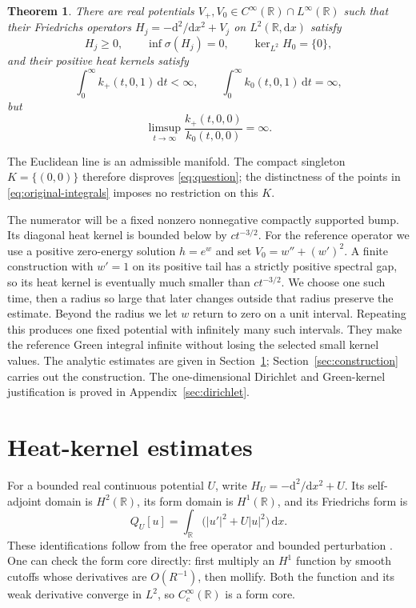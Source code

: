 \documentclass[11pt,a4paper]{article}
\newtheorem{theorem}{Theorem}[section]
\newcommand{\R}{\mathbb R}
\newcommand{\dd}{\,\mathrm d}
\newcommand{\spec}{\sigma}
\begin{document}
\begin{theorem}\label{thm:main}
There are real potentials $V_+,V_0\in C^\infty(\R)\cap L^\infty(\R)$ such
that their Friedrichs operators $H_j=-\mathrm d^2/\mathrm dx^2+V_j$ on
$L^2(\R,\mathrm dx)$ satisfy
\[
 H_j\geq0,\qquad \inf\spec(H_j)=0,\qquad \ker_{L^2}H_0=\{0\},
\]
and their positive heat kernels satisfy
\begin{equation}\label{eq:main-integrals}
 \int_0^\infty k_+(t,0,1)\dd t<\infty,
 \qquad \int_0^\infty k_0(t,0,1)\dd t=\infty,
\end{equation}
but
\begin{equation}\label{eq:main-ratio}
 \limsup_{t\to\infty}\frac{k_+(t,0,0)}{k_0(t,0,0)}=\infty.
\end{equation}
\end{theorem}

The Euclidean line is an admissible manifold. The compact singleton
$K=\{(0,0)\}$ therefore disproves \eqref{eq:question}; the distinctness of
the points in \eqref{eq:original-integrals} imposes no restriction on this $K$.

The numerator will be a fixed nonzero nonnegative compactly supported bump.
Its diagonal heat kernel is bounded below by $ct^{-3/2}$. For the reference
operator we use a positive zero-energy solution $h=e^w$ and set
$V_0=w''+(w')^2$. A finite construction with $w'=1$ on its positive tail has
a strictly positive spectral gap, so its heat kernel is eventually much
smaller than $ct^{-3/2}$. We choose one such time, then a radius so large
that later changes outside that radius preserve the estimate. Beyond the
radius we let $w$ return to zero on a unit interval. Repeating this produces
one fixed potential with infinitely many such intervals. They make the
reference Green integral infinite without losing the selected small kernel
values. The analytic estimates are given in Section~\ref{sec:estimates};
Section~\ref{sec:construction} carries out the construction. The
one-dimensional Dirichlet and Green-kernel justification is proved in
Appendix~\ref{sec:dirichlet}.

\section{Heat-kernel estimates}\label{sec:estimates}

For a bounded real continuous potential $U$, write
$H_U=-\mathrm d^2/\mathrm dx^2+U$. Its self-adjoint domain is $H^2(\R)$,
its form domain is $H^1(\R)$, and its Friedrichs form is
\begin{equation}\label{eq:form}
 Q_U[u]=\int_\R \bigl(|u'|^2+U|u|^2\bigr)\dd x.
\end{equation}
These identifications follow from the free operator and bounded perturbation
\cite[Theorems 6.4 and 7.8, Lemma 7.9]{Teschl}. One can check the form core
directly: first multiply an $H^1$ function by smooth cutoffs whose derivatives
are $O(R^{-1})$, then mollify. Both the function and its weak derivative
converge in $L^2$, so $C_c^\infty(\R)$ is a form core.
\end{document}
